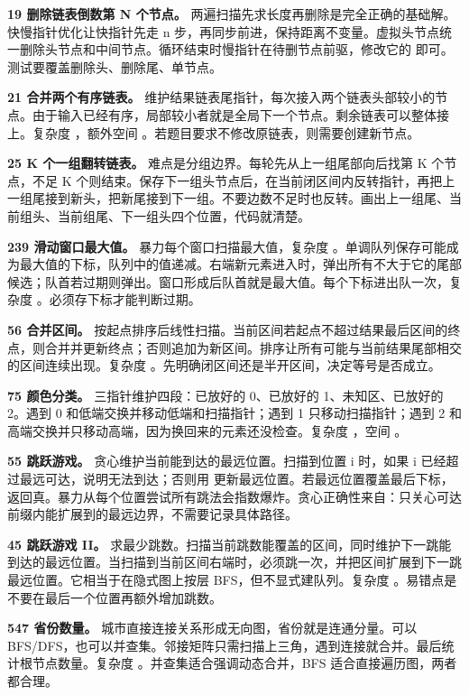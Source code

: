 \textbf{19 删除链表倒数第 N 个节点。} 两遍扫描先求长度再删除是完全正确的基础解。快慢指针优化让快指针先走 n 步，再同步前进，保持距离不变量。虚拟头节点统一删除头节点和中间节点。循环结束时慢指针在待删节点前驱，修改它的  即可。测试要覆盖删除头、删除尾、单节点。

\textbf{21 合并两个有序链表。} 维护结果链表尾指针，每次接入两个链表头部较小的节点。由于输入已经有序，局部较小者就是全局下一个节点。剩余链表可以整体接上。复杂度 ，额外空间 。若题目要求不修改原链表，则需要创建新节点。

\textbf{25 K 个一组翻转链表。} 难点是分组边界。每轮先从上一组尾部向后找第 K 个节点，不足 K 个则结束。保存下一组头节点后，在当前闭区间内反转指针，再把上一组尾接到新头，把新尾接到下一组。不要边数不足时也反转。画出上一组尾、当前组头、当前组尾、下一组头四个位置，代码就清楚。

\textbf{239 滑动窗口最大值。} 暴力每个窗口扫描最大值，复杂度 。单调队列保存可能成为最大值的下标，队列中的值递减。右端新元素进入时，弹出所有不大于它的尾部候选；队首若过期则弹出。窗口形成后队首就是最大值。每个下标进出队一次，复杂度 。必须存下标才能判断过期。

\textbf{56 合并区间。} 按起点排序后线性扫描。当前区间若起点不超过结果最后区间的终点，则合并并更新终点；否则追加为新区间。排序让所有可能与当前结果尾部相交的区间连续出现。复杂度 。先明确闭区间还是半开区间，决定等号是否成立。

\textbf{75 颜色分类。} 三指针维护四段：已放好的 0、已放好的 1、未知区、已放好的 2。遇到 0 和低端交换并移动低端和扫描指针；遇到 1 只移动扫描指针；遇到 2 和高端交换并只移动高端，因为换回来的元素还没检查。复杂度 ，空间 。

\textbf{55 跳跃游戏。} 贪心维护当前能到达的最远位置。扫描到位置 i 时，如果 i 已经超过最远可达，说明无法到达；否则用  更新最远位置。若最远位置覆盖最后下标，返回真。暴力从每个位置尝试所有跳法会指数爆炸。贪心正确性来自：只关心可达前缀内能扩展到的最远边界，不需要记录具体路径。

\textbf{45 跳跃游戏 II。} 求最少跳数。扫描当前跳数能覆盖的区间，同时维护下一跳能到达的最远位置。当扫描到当前区间右端时，必须跳一次，并把区间扩展到下一跳最远位置。它相当于在隐式图上按层 BFS，但不显式建队列。复杂度 。易错点是不要在最后一个位置再额外增加跳数。

\textbf{547 省份数量。} 城市直接连接关系形成无向图，省份就是连通分量。可以 BFS/DFS，也可以并查集。邻接矩阵只需扫描上三角，遇到连接就合并。最后统计根节点数量。复杂度 。并查集适合强调动态合并，BFS 适合直接遍历图，两者都合理。

